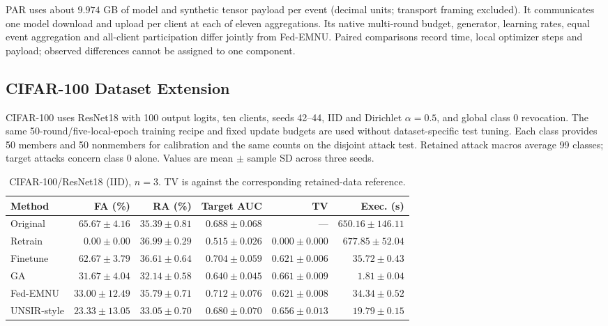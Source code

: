 \documentclass[software,article,submit,moreauthors]{Definitions/mdpi}
\begin{document}
PAR uses about $9.974$ GB of model and synthetic tensor payload per event (decimal units; transport framing excluded). It communicates one model download and upload per client at each of eleven aggregations. Its native multi-round budget, generator, learning rates, equal event aggregation and all-client participation differ jointly from Fed-EMNU. Paired comparisons record time, local optimizer steps and payload; observed differences cannot be assigned to one component.

\subsection{CIFAR-100 Dataset Extension}

\label{sec:cifar100}

CIFAR-100 uses ResNet18 with 100 output logits, ten clients, seeds 42--44, IID and Dirichlet $\alpha=0.5$, and global class 0 revocation. The same 50-round/five-local-epoch training recipe and fixed update budgets are used without dataset-specific test tuning. Each class provides 50 members and 50 nonmembers for calibration and the same counts on the disjoint attack test. Retained attack macros average 99 classes; target attacks concern class 0 alone. Values are mean $\pm$ sample SD across three seeds.

\begin{table}[H]
\caption{CIFAR-100/ResNet18 (IID), $n=3$. TV is against the corresponding retained-data reference.}
\label{tab:c100-iid}
\centering\footnotesize\setlength{\tabcolsep}{3.5pt}
\begin{tabular}{lrrrrr}
\toprule
Method & FA (\%) & RA (\%) & Target AUC & TV & Exec. (s)\\
\midrule
Original & $65.67 \pm 4.16$ & $35.39 \pm 0.81$ & $0.688 \pm 0.068$ & --- & $650.16 \pm 146.11$\\
Retrain & $0.00 \pm 0.00$ & $36.99 \pm 0.29$ & $0.515 \pm 0.026$ & $0.000 \pm 0.000$ & $677.85 \pm 52.04$\\
Finetune & $62.67 \pm 3.79$ & $36.61 \pm 0.64$ & $0.704 \pm 0.059$ & $0.621 \pm 0.006$ & $35.72 \pm 0.43$\\
GA & $31.67 \pm 4.04$ & $32.14 \pm 0.58$ & $0.640 \pm 0.045$ & $0.661 \pm 0.009$ & $1.81 \pm 0.04$\\
Fed-EMNU & $33.00 \pm 12.49$ & $35.79 \pm 0.71$ & $0.712 \pm 0.076$ & $0.621 \pm 0.008$ & $34.34 \pm 0.52$\\
UNSIR-style & $23.33 \pm 13.05$ & $33.05 \pm 0.70$ & $0.680 \pm 0.070$ & $0.656 \pm 0.013$ & $19.79 \pm 0.15$\\
\bottomrule
\end{tabular}
\end{table}
\end{document}
